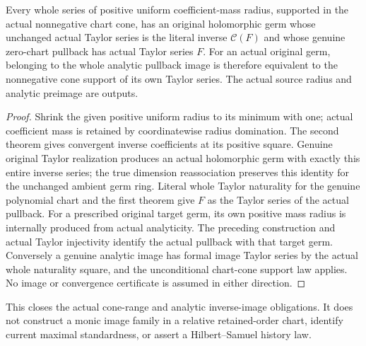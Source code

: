 \begin{theorem}
\label{hir:actual-zero-chart-convergent-cone-original-preimage}
\leanok
Every whole series of positive uniform coefficient-mass radius, supported in
the actual nonnegative chart cone, has an original holomorphic germ whose
unchanged actual Taylor series is the literal inverse $\mathcal C(F)$ and
whose genuine zero-chart pullback has actual Taylor series $F$.
For an actual original germ, belonging to the whole analytic pullback image
is therefore equivalent to the nonnegative cone support of its own Taylor
series. The actual source radius and analytic preimage are outputs.
\end{theorem}
\begin{proof}
Shrink the given positive uniform radius to its minimum with one; actual
coefficient mass is retained by coordinatewise radius domination. The second
theorem gives convergent inverse coefficients at its positive square. Genuine
original Taylor realization produces an actual holomorphic germ with exactly
this entire inverse series; the true dimension reassociation preserves this
identity for the unchanged ambient germ ring. Literal whole Taylor naturality
for the genuine polynomial chart and the first theorem give $F$ as the
Taylor series of the actual pullback. For a prescribed original target germ,
its own positive mass radius is internally produced from actual analyticity.
The preceding construction and actual Taylor injectivity identify the actual
pullback with that target germ. Conversely a genuine analytic image has
formal image Taylor series by the actual whole naturality square, and the
unconditional chart-cone support law applies. No image or convergence
certificate is assumed in either direction.
\end{proof}

This closes the actual cone-range and analytic inverse-image obligations.
It does not construct a monic image family in a relative retained-order chart,
identify current maximal standardness, or assert a Hilbert--Samuel history law.
